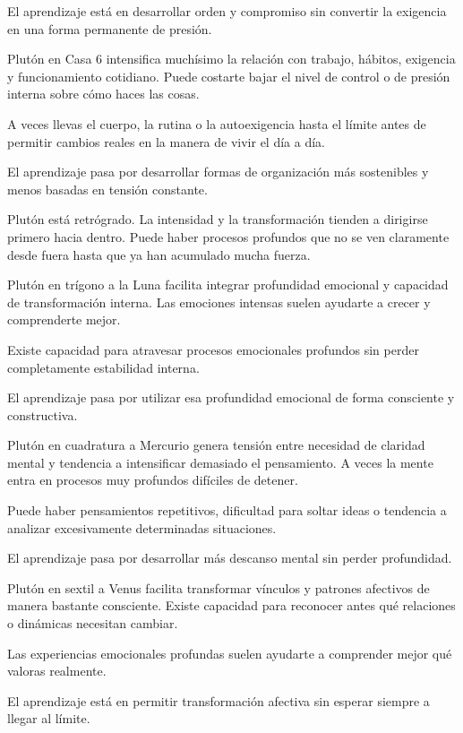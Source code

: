 \documentclass[11pt,a4paper]{article}
\begin{document}
El aprendizaje está en desarrollar orden y compromiso sin convertir la exigencia en una forma permanente de presión.

Plutón en Casa 6 intensifica muchísimo la relación con trabajo, hábitos, exigencia y funcionamiento cotidiano. Puede costarte bajar el nivel de control o de presión interna sobre cómo haces las cosas.

A veces llevas el cuerpo, la rutina o la autoexigencia hasta el límite antes de permitir cambios reales en la manera de vivir el día a día.

El aprendizaje pasa por desarrollar formas de organización más sostenibles y menos basadas en tensión constante.

Plutón está retrógrado. La intensidad y la transformación tienden a dirigirse primero hacia dentro. Puede haber procesos profundos que no se ven claramente desde fuera hasta que ya han acumulado mucha fuerza.

Plutón en trígono a la Luna facilita integrar profundidad emocional y capacidad de transformación interna. Las emociones intensas suelen ayudarte a crecer y comprenderte mejor.

Existe capacidad para atravesar procesos emocionales profundos sin perder completamente estabilidad interna.

El aprendizaje pasa por utilizar esa profundidad emocional de forma consciente y constructiva.

Plutón en cuadratura a Mercurio genera tensión entre necesidad de claridad mental y tendencia a intensificar demasiado el pensamiento. A veces la mente entra en procesos muy profundos difíciles de detener.

Puede haber pensamientos repetitivos, dificultad para soltar ideas o tendencia a analizar excesivamente determinadas situaciones.

El aprendizaje pasa por desarrollar más descanso mental sin perder profundidad.

Plutón en sextil a Venus facilita transformar vínculos y patrones afectivos de manera bastante consciente. Existe capacidad para reconocer antes qué relaciones o dinámicas necesitan cambiar.

Las experiencias emocionales profundas suelen ayudarte a comprender mejor qué valoras realmente.

El aprendizaje está en permitir transformación afectiva sin esperar siempre a llegar al límite.

\vspace{0.8cm}
\end{document}
